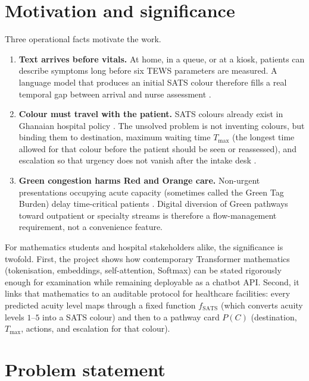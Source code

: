 \section{Motivation and significance}

Three operational facts motivate the work.

\begin{enumerate}
\item \textbf{Text arrives before vitals.} At home, in a queue, or at a kiosk, patients can describe symptoms long before six TEWS parameters are measured. A language model that produces an initial SATS colour therefore fills a real temporal gap between arrival and nurse assessment \citep{stewart2023nlp}.
\item \textbf{Colour must travel with the patient.} SATS colours already exist in Ghanaian hospital policy \citep{Rominski2014,kathsats}. The unsolved problem is not inventing colours, but binding them to destination, maximum waiting time \(T_{\max}\) (the longest time allowed for that colour before the patient should be seen or reassessed), and escalation so that urgency does not vanish after the intake desk \citep{satsmanual,Sundstrom2014}.
\item \textbf{Green congestion harms Red and Orange care.} Non-urgent presentations occupying acute capacity (sometimes called the Green Tag Burden) delay time-critical patients \citep{Yilmaz2021}. Digital diversion of Green pathways toward outpatient or specialty streams is therefore a flow-management requirement, not a convenience feature.
\end{enumerate}

For mathematics students and hospital stakeholders alike, the significance is twofold. First, the project shows how contemporary Transformer mathematics (tokenisation, embeddings, self-attention, Softmax) can be stated rigorously enough for examination while remaining deployable as a chatbot API. Second, it links that mathematics to an auditable protocol for healthcare facilities: every predicted acuity level maps through a fixed function \(f_{\mathrm{SATS}}\) (which converts acuity levels \(1\)--\(5\) into a SATS colour) and then to a pathway card \(P(C)\) (destination, \(T_{\max}\), actions, and escalation for that colour).

\section{Problem statement}

